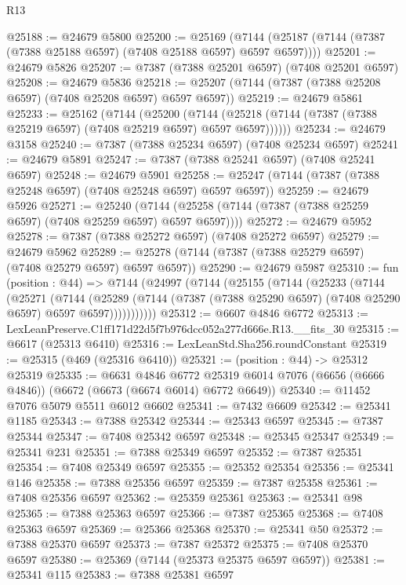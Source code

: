 \begin{lexlean}{R13}
\begin{coremodule}
@25188 := @24679 @5800
@25200 := @25169
    (@7144 (@25187 (@7144 (@7387 (@7388 @25188 @6597) (@7408 @25188 @6597) @6597 @6597))))
@25201 := @24679 @5826
@25207 := @7387 (@7388 @25201 @6597) (@7408 @25201 @6597)
@25208 := @24679 @5836
@25218 := @25207 (@7144 (@7387 (@7388 @25208 @6597) (@7408 @25208 @6597) @6597 @6597))
@25219 := @24679 @5861
@25233 := @25162
    (@7144
      (@25200
        (@7144 (@25218 (@7144 (@7387 (@7388 @25219 @6597) (@7408 @25219 @6597) @6597 @6597))))))
@25234 := @24679 @3158
@25240 := @7387 (@7388 @25234 @6597) (@7408 @25234 @6597)
@25241 := @24679 @5891
@25247 := @7387 (@7388 @25241 @6597) (@7408 @25241 @6597)
@25248 := @24679 @5901
@25258 := @25247 (@7144 (@7387 (@7388 @25248 @6597) (@7408 @25248 @6597) @6597 @6597))
@25259 := @24679 @5926
@25271 := @25240
    (@7144 (@25258 (@7144 (@7387 (@7388 @25259 @6597) (@7408 @25259 @6597) @6597 @6597))))
@25272 := @24679 @5952
@25278 := @7387 (@7388 @25272 @6597) (@7408 @25272 @6597)
@25279 := @24679 @5962
@25289 := @25278 (@7144 (@7387 (@7388 @25279 @6597) (@7408 @25279 @6597) @6597 @6597))
@25290 := @24679 @5987
@25310 := fun (position : @44) =>
  @7144
    (@24997
      (@7144
        (@25155
          (@7144
            (@25233
              (@7144
                (@25271
                  (@7144
                    (@25289
                      (@7144 (@7387 (@7388 @25290 @6597) (@7408 @25290 @6597) @6597 @6597)))))))))))
@25312 := @6607 @4846 @6772
@25313 := LexLeanPreserve.C1ff171d22d5f7b976dcc052a277d666e.R13.__fits_30
@25315 := @6617 (@25313 @6410)
@25316 := LexLeanStd.Sha256.roundConstant
@25319 := @25315 (@469 (@25316 @6410))
@25321 := (position : @44) -> @25312 @25319
@25335 := @6631
    @4846
    @6772
    @25319
    @6014
    @7076
    (@6656 (@6666 @4846))
    (@6672 (@6673 (@6674 @6014) @6772 @6649))
@25340 := @11452 @7076 @5079 @5511 @6012 @6602
@25341 := @7432 @6609
@25342 := @25341 @1185
@25343 := @7388 @25342
@25344 := @25343 @6597
@25345 := @7387 @25344
@25347 := @7408 @25342 @6597
@25348 := @25345 @25347
@25349 := @25341 @231
@25351 := @7388 @25349 @6597
@25352 := @7387 @25351
@25354 := @7408 @25349 @6597
@25355 := @25352 @25354
@25356 := @25341 @146
@25358 := @7388 @25356 @6597
@25359 := @7387 @25358
@25361 := @7408 @25356 @6597
@25362 := @25359 @25361
@25363 := @25341 @98
@25365 := @7388 @25363 @6597
@25366 := @7387 @25365
@25368 := @7408 @25363 @6597
@25369 := @25366 @25368
@25370 := @25341 @50
@25372 := @7388 @25370 @6597
@25373 := @7387 @25372
@25375 := @7408 @25370 @6597
@25380 := @25369 (@7144 (@25373 @25375 @6597 @6597))
@25381 := @25341 @115
@25383 := @7388 @25381 @6597

\end{coremodule}
\end{lexlean}
